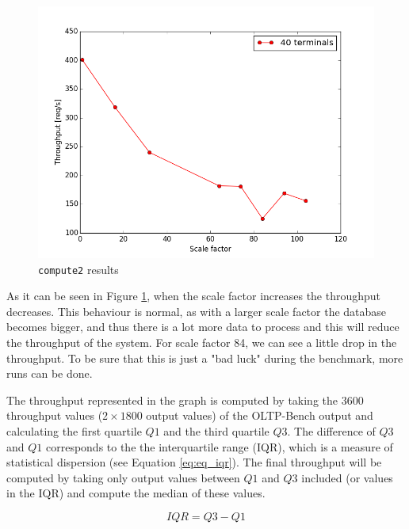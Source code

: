 \begin{figure}[h]
	\centering
	\includegraphics[scale=0.5]{figures/results/ph115_t40.png}
	\caption{\texttt{compute2} results}
	\label{fig:ph115_t40}
\end{figure}

As it can be seen in Figure \ref{fig:ph115_t40}, when the scale factor increases the throughput decreases. 
This behaviour is normal, as with a larger scale factor the database becomes bigger, and thus there is a lot more data to process and this will reduce the throughput of the system. 
For scale factor 84, we can see a little drop in the throughput. 
To be sure that this is just a "bad luck" during the benchmark, more runs can be done.

The throughput represented in the graph is computed by taking the 3600 throughput values ($2\times1800$ output values) of the OLTP-Bench output and calculating the first quartile $Q1$ and the third quartile $Q3$. 
The difference of $Q3$ and $Q1$ corresponds to the the interquartile range (IQR), which is a measure of statistical dispersion (see Equation \ref{eq:eq_iqr}). 
The final throughput will be computed by taking only output values between $Q1$ and $Q3$ included (or values in the IQR) and compute the median of these values.

\begin{equation}
   IQR = Q3 - Q1
   \label{eq:eq_iqr}
\end{equation}





